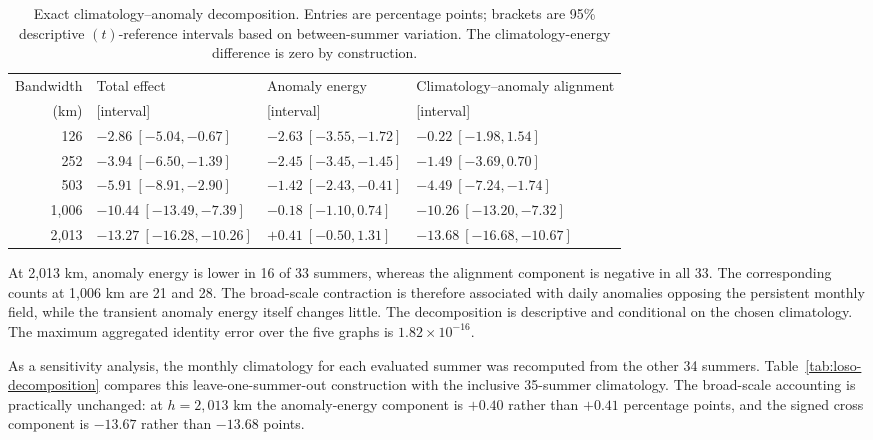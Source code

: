 \documentclass[namedate,webpdf,modern,mediumone]{oup-authoring-template}
\theoremstyle{thmstyleone}
\begin{document}
\begin{table}[htbp]
\centering
\caption{Exact climatology--anomaly decomposition. Entries are percentage
points; brackets are 95\% descriptive $(t)$-reference intervals based on
between-summer variation. The
climatology-energy difference is zero by construction.}
\label{tab:energy-decomposition}
\small
\setlength{\tabcolsep}{6pt}
\begin{tabular}{rlll}
\toprule
Bandwidth & Total effect & Anomaly energy & Climatology--anomaly alignment \\
(km) & [interval] & [interval] & [interval] \\
\midrule
126   & $-2.86\ [-5.04,-0.67]$ & $-2.63\ [-3.55,-1.72]$ & $-0.22\ [-1.98,1.54]$ \\
252   & $-3.94\ [-6.50,-1.39]$ & $-2.45\ [-3.45,-1.45]$ & $-1.49\ [-3.69,0.70]$ \\
503   & $-5.91\ [-8.91,-2.90]$ & $-1.42\ [-2.43,-0.41]$ & $-4.49\ [-7.24,-1.74]$ \\
1,006 & $-10.44\ [-13.49,-7.39]$ & $-0.18\ [-1.10,0.74]$ & $-10.26\ [-13.20,-7.32]$ \\
2,013 & $-13.27\ [-16.28,-10.26]$ & $+0.41\ [-0.50,1.31]$ & $-13.68\ [-16.68,-10.67]$ \\
\bottomrule
\end{tabular}
\end{table}

At 2,013 km, anomaly energy is lower in 16 of 33 summers, whereas the alignment
component is negative in all 33. The corresponding counts at 1,006 km are 21
and 28. The broad-scale contraction is therefore associated with daily
anomalies opposing the persistent monthly field, while the transient anomaly
energy itself changes little. The decomposition is descriptive and conditional
on the chosen climatology. The maximum aggregated identity error over the five
graphs is $1.82\times10^{-16}$.

As a sensitivity analysis, the monthly climatology for each evaluated summer
was recomputed from the other 34 summers. Table~\ref{tab:loso-decomposition}
compares this leave-one-summer-out construction with the inclusive 35-summer
climatology. The broad-scale accounting is practically unchanged: at
$h=2{,}013$ km the anomaly-energy component is $+0.40$ rather than $+0.41$
percentage points, and the signed cross component is $-13.67$ rather than
$-13.68$ points.
\end{document}
